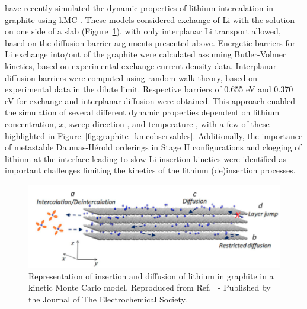 \documentclass[../main.tex]{subfiles}
\begin{document}
\citeauthor{gavilan-arriazu_kinetic_2020} have recently simulated the dynamic properties of lithium intercalation in graphite using kMC \cite{gavilan-arriazu_kinetic_2020, gavilan-arriazu_effect_2020,GAVILANARRIAZU2018133}. These models considered exchange of Li with the solution on one side of a slab (Figure~\ref{fig:graphite_kmcscheme}), with only interplanar Li transport allowed, based on the diffusion barrier arguments presented above. Energetic barriers for Li exchange into/out of the graphite were calculated assuming Butler-Volmer kinetics, based on experimental exchange current density data. Interplanar diffusion barriers were computed using random walk theory, based on experimental data in the dilute limit. Respective barriers of 0.655 eV and 0.370 eV for exchange and interplanar diffusion were obtained. This approach enabled the simulation of several different dynamic properties dependent on lithium concentration, $x$, \cite{gavilan-arriazu_kinetic_2020,gavilan-arriazu_kinetic_2020} sweep direction \cite{gavilan-arriazu_kinetic_2020}, and temperature \cite{gavilan-arriazu_effect_2020}, with a few of these highlighted in Figure~\ref{fig:graphite_kmcobservables}. Additionally, the importance of metastable Daumas-H\'{e}rold orderings in Stage II configurations \cite{GAVILANARRIAZU2018133} and clogging of lithium at the interface \cite{gavilan-arriazu_kinetic_2020} leading to slow Li insertion kinetics were identified as important challenges limiting the kinetics of the lithium (de)insertion processes.

\begin{figure}
    \centering
    \includegraphics[scale=2]{figures/kmc_scheme.png}
    \caption{Representation of insertion and diffusion of lithium in graphite in a kinetic Monte Carlo model. Reproduced from Ref.~ - Published by the Journal of The Electrochemical Society.}
    \label{fig:graphite_kmcscheme}
\end{figure}
\end{document}
